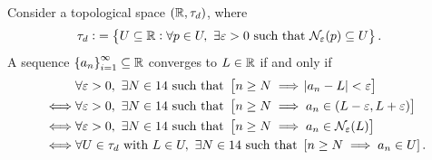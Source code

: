 \documentclass[11pt,openany]{article}
\begin{document}
\newpage
\begin{note}[]
Consider a topological space $(\mathbb{R},\tau_d)$, where \begin{align*}
	\tau_d:&=\set{U\subseteq\R:\forall p\in U,\ \exists\varepsilon>0\ \text{such that}\ \nbhd_\varepsilon(p)\subseteq U}.
\end{align*}
A sequence $\set{a_n}_{i=1}^\infty\subseteq \mathbb{R}$ converges to $L\in\mathbb{R}$ if and only if 
\begin{align*}
&\forall\varepsilon>0,\ \exists N\in\N\ \text{such that}\ \left[ n\geq N\implies \abs{a_n-L}<\varepsilon\right]\\
\iff&\forall\varepsilon>0,\ \exists N\in\N\ \text{such that}\ \left[ n\geq N\implies a_n\in(L-\varepsilon,L+\varepsilon)\right]\\
\iff&\forall\varepsilon>0,\ \exists N\in\N\ \text{such that}\ \left[ n\geq N\implies a_n\in\nbhd_{\varepsilon}(L)\right]\\
\iff&\forall U\in\tau_d\ \text{with}\ L\in U,\ \exists N\in\N\ \text{such that}\ \left[ n\geq N\implies a_n\in U\right].
\end{align*}


\end{note}
\end{document}

